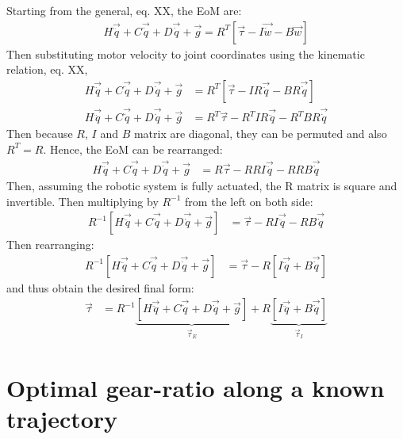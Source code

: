 Starting from the general, eq. XX, the EoM are:
%
\begin{align}
H \vec{ \ddot{q} } + C\vec{ \dot{q} } + D \vec{ \dot{q} } + \vec{ g }
		= R^T  \left[ 
		\vec{ \tau } - I \vec{ \dot{w} } - B \vec{ w }       
		\right]
\end{align}
%
Then substituting motor velocity to joint coordinates using the kinematic relation, eq. XX,
%
\begin{align}
H \vec{ \ddot{q} } + C\vec{ \dot{q} } + D \vec{ \dot{q} } + \vec{ g }
		&= R^T  \left[ 
		\vec{ \tau } - I R \vec{ \ddot{q} } - B R\vec{ \dot{q} }       
		\right] \\
H \vec{ \ddot{q} } + C\vec{ \dot{q} } + D \vec{ \dot{q} } + \vec{ g }
		&= R^T \vec{ \tau } - R^T I R \vec{ \ddot{q} } - R^T B R \vec{ \dot{q} }  
\end{align}
%
Then because $R$, $I$ and $B$ matrix are diagonal, they can be permuted and also $R^T=R$. Hence, the EoM can be rearranged:
%
\begin{align}
H \vec{ \ddot{q} } + C\vec{ \dot{q} } + D \vec{ \dot{q} } + \vec{ g }
		&= R \vec{ \tau } - R R I \vec{ \ddot{q} } - R R B \vec{ \dot{q} }  
\end{align}
%
Then, assuming the robotic system is fully actuated, the R matrix is square and invertible. Then multiplying by $R^{-1}$ from the left on both side:
%
\begin{align}
R^{-1} \left[ H \vec{ \ddot{q} } + C\vec{ \dot{q} } + D \vec{ \dot{q} } + \vec{ g } \right]
		&= \vec{ \tau } - R I \vec{ \ddot{q} } - R B \vec{ \dot{q} }  
\end{align}
%
Then rearranging:
%
\begin{align}
R^{-1} \left[ H \vec{ \ddot{q} } + C\vec{ \dot{q} } + D \vec{ \dot{q} } + \vec{ g } \right]
		&= \vec{ \tau } - R  \left[ I \vec{ \ddot{q} } + B \vec{ \dot{q} }  \right]
\end{align}
%
and thus obtain the desired final form:
%
\begin{align}
\vec{ \tau } &=  R^{-1} \underbrace{ \left[ H \vec{ \ddot{q} } + C\vec{ \dot{q} } + D \vec{ \dot{q} } + \vec{ g } \right] }_{\vec{\tau}_E}
 + R \underbrace{ \left[ I \vec{ \ddot{q} } + B \vec{ \dot{q} }  \right]}_{\vec{\tau}_I}
\end{align}
%



\newpage
\section{Optimal gear-ratio along a known trajectory}
\label{sec:optgearproof}

